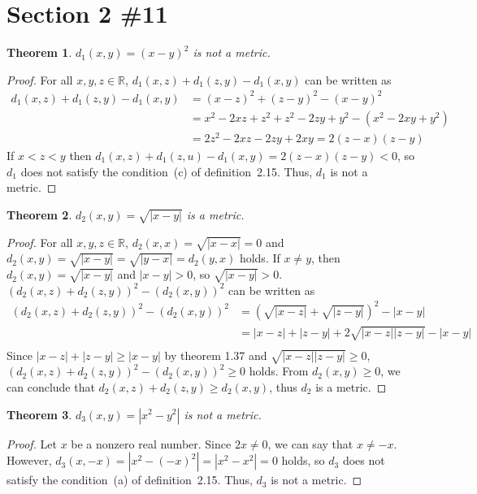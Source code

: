 \documentclass{scrartcl}
\newtheorem{theorem}{Theorem}
\begin{document}
\section{Section 2 \#11}
\begin{theorem}
  \(d_1(x, y) = (x - y)^2\) is not a metric.
\end{theorem}
\begin{proof}
  For all \(x, y, z \in \mathbb{R}\), \(d_1(x, z) + d_1(z, y) - d_1(x, y)\) can be written as
  \begin{align*}
    d_1(x, z) + d_1(z, y) - d_1(x, y) &= (x - z)^2 + (z - y)^2 - (x - y)^2 \\
                                      &= x^2 - 2xz + z^2 + z^2 - 2zy + y^2 - (x^2 - 2xy + y^2) \\
                                      &= 2z^2 - 2xz - 2zy + 2xy = 2(z - x)(z - y)
  \end{align*}
  If \(x < z < y\) then \(d_1(x, z) + d_1(z, u) - d_1(x, y) = 2(z - x)(z - y) < 0\), so \(d_1\) does not satisfy the condition~(c) of definition~2.15.
  Thus, \(d_1\) is not a metric.
\end{proof}

\begin{theorem}
  \(d_2(x, y) = \sqrt{|x - y|}\) is a metric.
\end{theorem}
\begin{proof}
  For all \(x, y, z \in \mathbb{R}\), \(d_2(x, x) = \sqrt{|x - x|} = 0\) and \(d_2(x, y) = \sqrt{|x - y|} = \sqrt{|y - x|} = d_2(y, x)\) holds.
  If \(x \not = y\), then \(d_2(x, y) = \sqrt{|x - y|}\) and \(|x - y| > 0\), so \(\sqrt{|x - y|} > 0\).
  \((d_2(x, z) + d_2(z, y))^2 - (d_2(x, y))^2\) can be written as
  \begin{align*}
    (d_2(x, z) + d_2(z, y))^2 - (d_2(x, y))^2 &= \left(\sqrt{|x - z|} + \sqrt{|z - y|}\right)^2 - |x - y| \\
                                              &= |x - z| + |z - y| + 2\sqrt{|x - z||z - y|} - |x - y| \\
  \end{align*}
  Since \(|x - z| + |z - y| \geq |x - y|\) by theorem 1.37 and \(\sqrt{|x - z||z - y|} \geq 0\), \((d_2(x, z) + d_2(z, y))^2 - (d_2(x, y))^2 \geq 0\) holds.
  From \(d_2(x, y) \geq 0\), we can conclude that \(d_2(x, z) + d_2(z, y) \geq d_2(x, y)\), thus \(d_2\) is a metric.
\end{proof}

\begin{theorem}
  \(d_3(x, y) = |x^2 - y^2|\) is not a metric.
\end{theorem}
\begin{proof}
  Let \(x\) be a nonzero real number.
  Since \(2x \not = 0\), we can say that \(x \not = -x\).
  However, \(d_3(x, -x) = |x^2 - (-x)^2| = |x^2 - x^2| = 0\) holds, so \(d_3\) does not satisfy the condition~(a) of definition~2.15.
  Thus, \(d_3\) is not a metric.
\end{proof}
\end{document}
